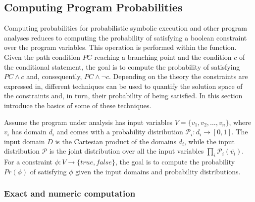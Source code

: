 \subsection{Computing Program Probabilities}
\label{sec:computingprobabilities}

Computing probabilities for probabilistic symbolic execution and other program analyses reduces to computing the probability of satisfying a boolean constraint over the program variables. This operation is performed within the  function. Given the path condition $PC$ reaching a branching point and the condition $c$ of the conditional statement, the goal is to compute the probability of satisfying $PC \land c$ and, consequently, $PC \land \neg c$. Depending on the theory the constraints are expressed in, different techniques can be used to quantify the solution space of the constraints and, in turn, their probability of being satisfied. In this section introduce the basics of some of these techniques.

Assume the program under analysis has input variables $V=\{v_1, v_2, \dots, v_n\}$, where $v_i$ has domain $d_i$ and comes with a probability distribution $\mathcal{P}_i: d_i \to [0, 1]$. The input domain $D$ is the Cartesian product of the domains $d_i$, while the input distribution $\mathcal{P}$ is the joint distribution over all the input variables $\prod_i \mathcal{P}_i(\bar{v_i})$. For a constraint $\phi: V \to \{true, false\}$, the goal is to compute the probability $Pr(\phi)$ of satisfying $\phi$ given the input domains and probability distributions. 

\subsubsection{Exact and numeric computation}\label{sec:computingprobabilitiesExact}

